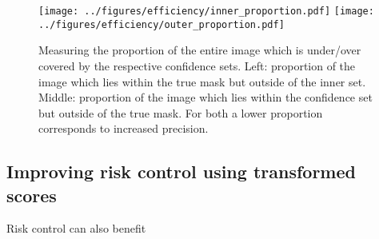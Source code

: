 \begin{figure}
	\begin{center}
			\texttt{[image: ../figures/efficiency/inner\_proportion.pdf]}
			\quad\quad
		\texttt{[image: ../figures/efficiency/outer\_proportion.pdf]}
	\end{center}
	\caption{Measuring the proportion of the entire image which is under/over covered by the respective confidence sets. Left: proportion of the image which lies within the true mask but outside of the inner set. Middle: proportion of the image which lies within the confidence set but outside of the true mask. For both a lower proportion corresponds to increased precision. }\label{fig:efficiency2}
\end{figure}

\subsection{Improving risk control using transformed scores}
Risk control can also benefit  
 


